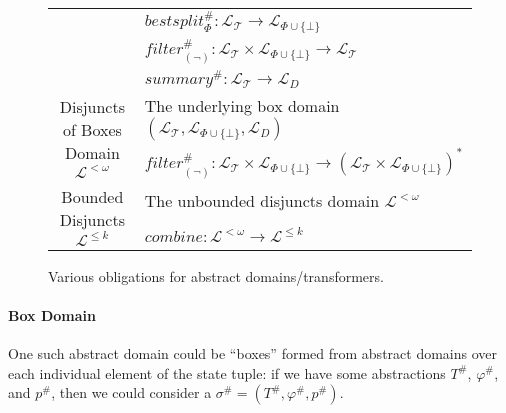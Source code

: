 \begin{figure}
\begin{tabular}{cl}
& $\mathit{bestsplit}^\#_\Phi : \mathcal{L}_\mathcal{T} \rightarrow
\mathcal{L}_{\Phi \cup \{\bot\}}$ \\
& $\mathit{filter}^\#_{(\lnot)} :
\mathcal{L}_\mathcal{T} \times \mathcal{L}_{\Phi\cup\{\bot\}}
\rightarrow \mathcal{L}_\mathcal{T}$ \\
& $\mathit{summary}^\# : \mathcal{L}_\mathcal{T} \rightarrow \mathcal{L}_D$ \\
\midrule
\multirow{2}{*}{Disjuncts of Boxes Domain $\mathcal{L}^{<\omega}$}
& The underlying box domain $(\mathcal{L}_\mathcal{T}, \mathcal{L}_{\Phi\cup\{\bot\}}, \mathcal{L}_D)$ \\
& $\mathit{filter}^\#_{(\lnot)} :
\mathcal{L}_\mathcal{T} \times \mathcal{L}_{\Phi\cup\{\bot\}} \rightarrow
(\mathcal{L}_\mathcal{T} \times \mathcal{L}_{\Phi\cup\{\bot\}})^*$ \\
\midrule
\multirow{2}{*}{Bounded Disjuncts $\mathcal{L}^{\leq k}$}
& The unbounded disjuncts domain $\mathcal{L}^{<\omega}$ \\
& $\mathit{combine} : \mathcal{L}^{<\omega} \rightarrow \mathcal{L}^{\leq k}$ \\
\bottomrule
\end{tabular}
\caption{Various obligations for abstract domains/transformers.}
\label{fig:obligations}
\end{figure}

\paragraph{Box Domain}
One such abstract domain could be ``boxes'' formed from abstract domains
over each individual element of the state tuple:
if we have some abstractions $T^\#$, $\varphi^\#$, and $p^\#$,
then we could consider a $\sigma^\# = (T^\#, \varphi^\#, p^\#)$.

